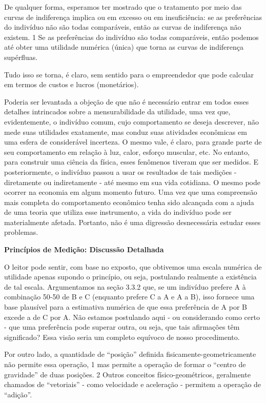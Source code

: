\documentclass[12pt]{article}
\begin{document}
De qualquer forma, esperamos ter mostrado que o tratamento por meio das curvas de indiferença implica ou em excesso ou em insuficiência: se as preferências do indivíduo não são todas comparáveis, então as curvas de indiferença não existem. 1 Se as preferências do indivíduo são todas comparáveis, então podemos até obter uma utilidade numérica (única) que torna as curvas de indiferença supérfluas.

Tudo isso se torna, é claro, sem sentido para o empreendedor que pode calcular em termos de custos e lucros (monetários).

Poderia ser levantada a objeção de que não é necessário entrar em todos esses detalhes intrincados sobre a mensurabilidade da utilidade, uma vez que, evidentemente, o indivíduo comum, cujo comportamento se deseja descrever, não mede suas utilidades exatamente, mas conduz suas atividades econômicas em uma esfera de considerável incerteza. O mesmo vale, é claro, para grande parte de seu comportamento em relação à luz, calor, esforço muscular, etc. No entanto, para construir uma ciência da física, esses fenômenos tiveram que ser medidos. E posteriormente, o indivíduo passou a usar os resultados de tais medições - diretamente ou indiretamente - até mesmo em sua vida cotidiana. O mesmo pode ocorrer na economia em algum momento futuro. Uma vez que uma compreensão mais completa do comportamento econômico tenha sido alcançada com a ajuda de uma teoria que utiliza esse instrumento, a vida do indivíduo pode ser materialmente afetada. Portanto, não é uma digressão desnecessária estudar esses problemas.

\textbf{Princípios de Medição: Discussão Detalhada}

O leitor pode sentir, com base no exposto, que obtivemos uma escala numérica de utilidade apenas supondo o princípio, ou seja, postulando realmente a existência de tal escala. Argumentamos na seção 3.3.2 que, se um indivíduo prefere A à combinação 50-50 de B e C (enquanto prefere C a A e A a B), isso fornece uma base plausível para a estimativa numérica de que essa preferência de A por B excede a de C por A. Não estamos postulando aqui - ou considerando como certo - que uma preferência pode superar outra, ou seja, que tais afirmações têm significado? Essa visão seria um completo equívoco de nosso procedimento.

Por outro lado, a quantidade de “posição” definida fisicamente-geometricamente não permite essa operação, 1 mas permite a operação de formar o “centro de gravidade” de duas posições. 2 Outros conceitos físico-geométricos, geralmente chamados de “vetoriais” - como velocidade e aceleração - permitem a operação de “adição”.
\end{document}
